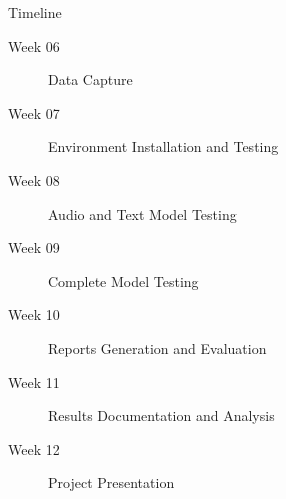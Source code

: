 \documentclass{beamer}
\begin{document}
    \begin{frame}{Timeline}
        \begin{description}
            \item[Week 06]
                Data Capture
            \item[Week 07]
                Environment Installation and Testing
            \item[Week 08]
                Audio and Text Model Testing
            \item[Week 09]
                Complete Model Testing
            \item[Week 10]
                Reports Generation and Evaluation
            \item[Week 11]
                Results Documentation and Analysis
            \item[Week 12]
                Project Presentation
        \end{description}
    \end{frame}
\end{document}
